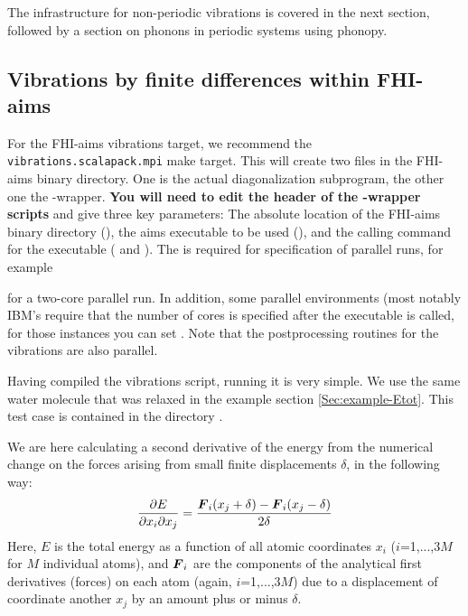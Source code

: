 The infrastructure for non-periodic vibrations is covered in the next
section, followed by a section on phonons in periodic systems using
phonopy. 

\subsection*{Vibrations by finite differences within FHI-aims}

For the FHI-aims vibrations target, we recommend the
\texttt{vibrations.scalapack.mpi} make target. This will create two 
files in the FHI-aims binary directory. One is the actual
diagonalization subprogram, the other one the
-wrapper. \textbf{You will need to edit the header of the
  -wrapper scripts} and give three key parameters: The
absolute location of the FHI-aims binary directory
(), the aims executable to be used
(), and the calling command for the executable
( and ). The
 is required for specification of 
parallel runs, for example 


for a two-core parallel run. In addition, some parallel environments
(most notably IBM's  require that the number of cores is
specified after the executable is called, for those instances you can
set . Note that the postprocessing routines
for the vibrations are also parallel. 

Having compiled the vibrations script, running it is
very simple. We use the same water molecule that was relaxed in the example section
\ref{Sec:example-Etot}. This test case is
contained in the directory . 

We are here calculating a second derivative of the energy from the
numerical change on the forces arising from small finite
displacements $\delta$, in the following way:
\begin{equation}
  \frac{\partial E}{\partial x_i \partial x_j} = \frac{\mbox{\boldmath$F$}_i(x_j+\delta)-\mbox{\boldmath$F$}_i(x_j-\delta)}{2 \delta}
\end{equation}
Here, $E$ is the total energy as a function of all atomic coordinates
$x_i$ ($i$=1,...,3$M$ for $M$ individual atoms), and $\mbox{\boldmath$F$}_i$ are the
components of the analytical first derivatives (forces) on each atom
(again, $i$=1,...,3$M$) due to a displacement of coordinate another
$x_j$ by an amount plus or minus $\delta$. 

